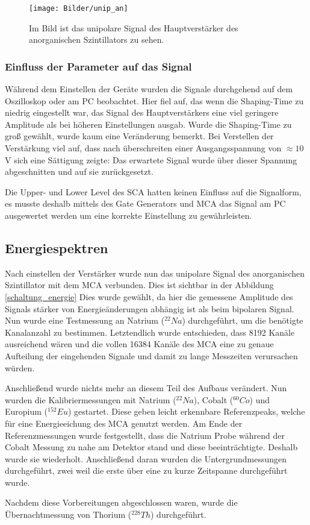 \begin{figure}[h]
	\centering
	\texttt{[image: Bilder/unip\_an]}
	\caption[Unipolares Signal des Anorganischen Amp.]{\small Im Bild ist das unipolare Signal des Hauptverstärker des anorganischen Szintillators zu sehen. }
	\label{an_uni}
\end{figure}
\subsubsection{Einfluss der Parameter auf das Signal}
Während dem Einstellen der Geräte wurden die Signale durchgehend auf dem Oszilloskop oder am PC beobachtet. Hier fiel auf, das wenn die Shaping-Time zu niedrig eingestellt war, das Signal des Hauptverstärkers eine viel geringere Amplitude als bei höheren Einstellungen ausgab. Wurde die Shaping-Time zu groß gewählt, wurde kaum eine Veränderung bemerkt. Bei Verstellen der Verstärkung viel auf, dass nach überschreiten einer Ausgangsspannung von $\approx 10\,$V sich eine Sättigung zeigte: Das erwartete Signal wurde über dieser Spannung abgeschnitten und auf sie zurückgesetzt.\par
Die Upper- und Lower Level des SCA hatten keinen Einfluss auf die Signalform, es musste deshalb mittels des Gate Generators und MCA das Signal am PC ausgewertet werden um eine korrekte Einstellung zu gewährleisten. 
\subsection{Energiespektren}
Nach einstellen der Verstärker wurde nun das unipolare Signal des anorganischen Szintillator mit dem MCA verbunden. Dies ist sichtbar in der Abbildung \ref{schaltung_energie} Dies wurde gewählt, da hier die  gemessene Amplitude des Signals stärker von Energieänderungen abhängig ist als beim bipolaren Signal. Nun wurde eine Testmessung an Natrium ($^{22}Na$) durchgeführt, um die benötigte Kanalanzahl zu bestimmen. Letztendlich wurde entschieden, dass 8192 Kanäle ausreichend wären und die vollen 16384 Kanäle des MCA eine zu genaue Aufteilung der eingehenden Signale und damit zu lange Messzeiten verursachen würden.\par
Anschließend wurde nichts mehr an diesem Teil des Aufbaus verändert. Nun wurden die Kalibriermessungen mit Natrium ($^{22}Na$), Cobalt ($^{60}Co$) und Europium ($^{152}Eu$) gestartet. Diese geben leicht erkennbare Referenzpeaks, welche für eine Energieeichung des MCA genutzt werden. Am Ende der Referenzmessungen wurde festgestellt, dass die Natrium Probe während der Cobalt Messung zu nahe am Detektor stand und diese beeinträchtigte. Deshalb wurde sie wiederholt. Anschließend daran wurden die Untergrundmessungen durchgeführt, zwei weil die erste über eine zu kurze Zeitspanne durchgeführt wurde.\par
Nachdem diese Vorbereitungen abgeschlossen waren, wurde die Übernachtmessung von Thorium ($^{228}Th$) durchgeführt. 

